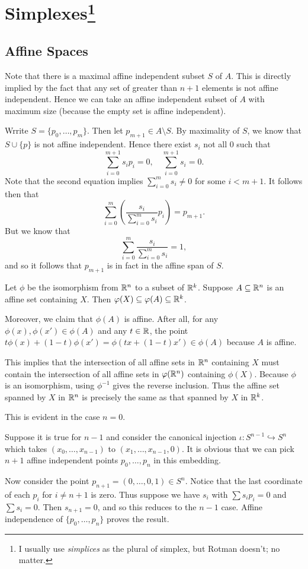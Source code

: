 \documentclass[../../solutions.tex]{subfiles}
\begin{document}
\section[Simplexes]{Simplexes\footnote{I usually use \emph{simplices} as the plural of simplex, but Rotman doesn't; no matter.}}
\subsection{Affine Spaces}
\begin{exercise} \leavevmode
Note that there is a maximal affine independent subset $S$ of $A$. This is directly implied by the fact that any set of greater than $n+1$ elements is not affine independent. Hence we can take an affine independent subset of $A$ with maximum size (because the empty set is affine independent). 

Wrrite $S=\{p_0,\dots,p_m\}$. Then let $p_{m+1}\in A\setminus S$. By maximality of $S$, we know that $S\cup\{p\}$ is not affine independent. Hence there exist $s_i$ not all 0 such that \[\sum_{i=0}^{m+1}s_ip_i=0,\quad\sum_{i=0}^{m+1}s_i=0.\] Note that the second equation implies $\sum_{i=0}^ms_i\ne0$ for some $i<m+1$. It follows then that \[\sum_{i=0}^m\left(\frac{s_i}{\sum_{i=0}^ms_i}p_i\right)=p_{m+1}.\] But we know that \[\sum_{i=0}^m\frac{s_i}{\sum_{i=0}^ms_i}=1,\] and so it follows that $p_{m+1}$ is in fact in the affine span of $S$. 
\end{exercise} 

\begin{exercise} \leavevmode
Let $\phi$ be the isomorphism from $\mathbb{R}^n$ to a subset of $\mathbb{R}^k$. Suppose $A\subseteq\mathbb{R}^n$ is an affine set containing $X$. Then $\varphi(X)\subseteq\varphi(A)\subseteq\mathbb{R}^k$. 

Moreover, we claim that $\phi(A)$ is affine. After all, for any $\phi(x),\phi(x')\in\phi(A)$ and any $t\in\mathbb{R}$, the point $t\phi(x)+(1-t)\phi(x')=\phi(tx+(1-t)x')\in\phi(A)$ because $A$ is affine. 

This implies that the intersection of all affine sets in $\mathbb{R}^n$ containing $X$ must contain the intersection of all affine sets in $\varphi(\mathbb{R}^n)$ containing $\phi(X)$. Because $\phi$ is an isomorphism, using $\phi^{-1}$ gives the reverse inclusion. Thus the affine set spanned by $X$ in $\mathbb{R}^n$ is precisely the same as that spanned by $X$ in $\mathbb{R}^k$. 
\end{exercise} 

\begin{exercise} \leavevmode
This is evident in the case $n=0$. 

Suppose it is true for $n-1$ and consider the canonical injection $\iota:S^{n-1}\hookrightarrow S^n$ which takes $(x_0,\dots,x_{n-1})$ to $(x_1,\dots,x_{n-1},0)$. It is obvious that we can pick $n+1$ affine independent points $p_0,\dots,p_n$ in this embedding. 

Now consider the point $p_{n+1}=(0,\dots,0,1)\in S^n$. Notice that the last coordinate of each $p_i$ for $i\ne n+1$ is zero. Thus suppose we have $s_i$ with $\sum s_ip_i=0$ and $\sum s_i=0$. Then $s_{n+1}=0$, and so this reduces to the $n-1$ case. Affine independence of $\{p_0,\dots,p_n\}$ proves the result. 
\end{exercise} 
\end{document}
